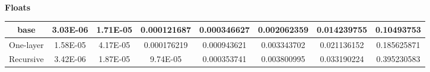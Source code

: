 \documentclass{article}         %
\begin{document}
\begin{center}
\begin{tabular}{|c|c c c c c c c|}
    \end{tabular}\\
    \textbf{Floats}\\
    \begin{tabular}{|c|c c c c c c c|}
 \hline 
base & 3.03E-06 & 1.71E-05 & 0.000121687 & 0.000346627 & 0.002062359 & 0.014239755 & 0.10493753\\ 
 \hline 
One-layer & 1.58E-05 & 4.17E-05 & 0.000176219 & 0.000943621 & 0.003343702 & 0.021136152 & 0.185625871\\ 
 \hline 
Recursive & 3.42E-06 & 1.87E-05 & 9.74E-05 & 0.000353741 & 0.003800995 & 0.033190224 & 0.395230583\\ 
 \hline  
    \end{tabular}
\end{center}
\end{document}
